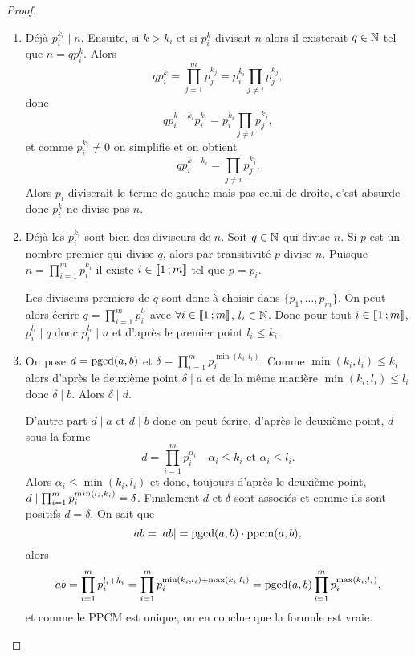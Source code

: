 \begin{proof}
  \begin{enumerate}
  \item Déjà $p_i^{k_i} \mid n$. Ensuite, si $k > k_i$ et si $p_i^k$ divisait $n$ alors il existerait $q \in \mathbb{N}$ tel que $n=q p_i^k$. Alors
    \begin{equation}
      qp_i^k = \prod_{j=1}^m p_j^{k_j} = p_i^{k_i} \prod_{j \neq i} p_j^{k_j},
    \end{equation}
    donc
    \begin{equation}
      qp_i^{k-k_i}p_i^{k_i} =  p_i^{k_i} \prod_{j \neq i} p_j^{k_j},
    \end{equation}
    et comme $p_i^{k_i} \neq 0$ on simplifie et on obtient
    \begin{equation}
      qp_i^{k-k_i} = \prod_{j \neq i} p_j^{k_j}.
    \end{equation}
    Alors $p_i$ diviserait le terme de gauche mais pas celui de droite, c'est absurde donc $p_i^k$ ne divise pas $n$.
  \item Déjà les $p_i^{k_i}$ sont bien des diviseurs de $n$. Soit $q \in \mathbb{N}$ qui divise $n$. Si $p$ est un nombre premier qui divise $q$, alors par transitivité $p$ divise $n$. Puisque $n=\prod_{i=1}^m p_i^{k_i}$ il existe $i \in \mathopen{\llbracket}1\mathclose{}\mathpunct{};m\mathclose{\rrbracket}$ tel que $p=p_i$.

    Les diviseurs premiers de $q$ sont donc à choisir dans $\{p_1, \ldots, p_m\}$. On peut alors écrire $q=\prod_{i=1}^m p_i^{l_i}$ avec $\forall i \in \mathopen{\llbracket}1\mathclose{}\mathpunct{};m\mathclose{\rrbracket}$, $l_i \in \mathbb{N}$. Donc pour tout $i\in \mathopen{\llbracket}1\mathclose{}\mathpunct{};m\mathclose{\rrbracket}$, $p_i^{l_i} \mid q$ donc $p_i^{l_i} \mid n$ et d'après le premier point $l_i \leq k_i$.
  \item On pose $d= \operatorname{pgcd}(a,b)$ et $\delta = \prod_{i=1}^m p_i^{\min(k_i,l_i)}$. Comme $\min(k_i, l_i) \leq k_i$ alors d'après le deuxième point $\delta \mid a$ et de la même manière $\min(k_i, l_i) \leq l_i$ donc $\delta \mid b$. Alors $\delta \mid d$.

    D'autre part $d \mid a$ et $d \mid b$ donc on peut écrire, d'après le deuxième point, $d$ sous la forme
    \begin{equation}
      d = \prod_{i=1}^m p_i^{\alpha_i} \quad \alpha_i \leq k_i \text{~et~} \alpha_i \leq l_i.
    \end{equation}
    Alors $\alpha_i \leq \min(k_i,l_i)$ et donc, toujours d'après le deuxième point, $d \mid \prod_{i=1}^m p_i ^{\\min(l_i,k_i)}=\delta$. Finalement $d$ et $\delta$ sont associés et comme ils sont positifs $d=\delta$. On sait que
    \begin{equation}
      ab=\left\lvert ab\right\rvert = \operatorname{pgcd}(a,b) \cdot \operatorname{ppcm}(a,b),
    \end{equation}
    alors
    \begin{equation}
      ab = \prod_{i=1}^m p_i^{l_i+k_i}= \prod_{i=1}^m p_i^{\min(k_i,l_i)+\max(k_i,l_i)} = \operatorname{pgcd}(a,b) \prod_{i=1}^m p_i^{\max(k_i,l_i)},
    \end{equation}
    et comme le PPCM est unique, on en conclue que la formule est vraie.
  \end{enumerate}
\end{proof}

